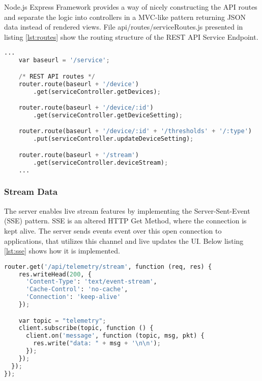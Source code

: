     Node.js Express Framework provides a way of nicely constructing the API routes and separate the logic into controllers in a MVC-like pattern returning JSON data instead of rendered views. File api/routes/serviceRoutes.js presented in listing \ref{lst:routes} show the routing structure of the REST API Service Endpoint. 

\begin{lstlisting}[language=Python, caption=Node.js REST API Routes, label={lst:routes}, basicstyle=\tiny]
    ...
    var baseurl = '/service';

    /* REST API routes */
    router.route(baseurl + '/device')
        .get(serviceController.getDevices);

    router.route(baseurl + '/device/:id')
        .get(serviceController.getDeviceSetting);

    router.route(baseurl + '/device/:id' + '/thresholds' + '/:type')
        .put(serviceController.updateDeviceSetting);

    router.route(baseurl + '/stream')
        .get(serviceController.deviceStream); 
    ...
\end{lstlisting}

\subsubsection{Stream Data}
The server enables live stream features by implementing the Server-Sent-Event (SSE) pattern. SSE is an altered HTTP Get Method, where the connection is kept alive. The server sends events event over this open connection to applications, that utilizes this channel and live updates the UI. Below listing \ref{lst:sse} shows how it is implemented.

\begin{lstlisting}[language=Python, caption=Server Sent Event, label={lst:sse}, basicstyle=\tiny]
    router.get('/api/telemetry/stream', function (req, res) {
    res.writeHead(200, {
      'Content-Type': 'text/event-stream',
      'Cache-Control': 'no-cache',
      'Connection': 'keep-alive'
    });

    var topic = "telemetry";
    client.subscribe(topic, function () {
      client.on('message', function (topic, msg, pkt) {
        res.write("data: " + msg + '\n\n');
      });
    });
  });
});
\end{lstlisting}

